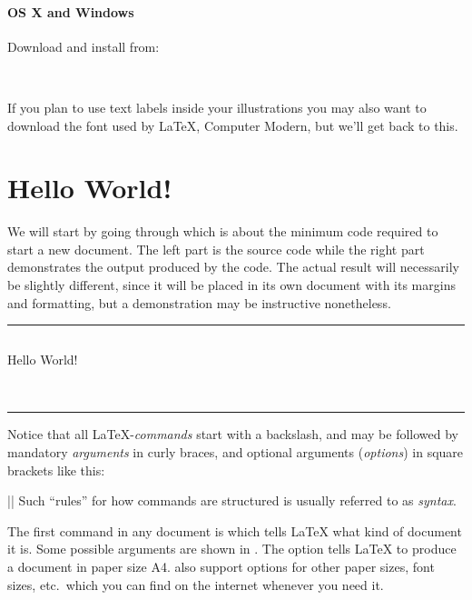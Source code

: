 \paragraph{OS X and Windows}
Download and install from:

~\\

If you plan to use text labels inside your illustrations you may also want to download the font used by \LaTeX{}, Computer Modern, but we'll get back to this.


\section{Hello World!}
We will start by going through  which is about the minimum code required to start a new document. The left part is the source code while the right part demonstrates the output produced by the code. The actual result will necessarily be slightly different, since it will be placed in its own document with its margins and formatting, but a demonstration may be instructive nonetheless.

\begin{listing}
	\rule{\textwidth}{0.4pt}
	\begin{minipage}[t]{0.49\textwidth}
		\inputminted[frame=none]{latex}{latex/first.tex}
	\end{minipage}\hfill\vline\hfill
	\begin{minipage}[t]{0.49\textwidth}
		Hello World!
	\end{minipage}\\[0.5em]
	\rule{\textwidth}{0.4pt}
	\caption{A (near-)minimal \LaTeX{} document}
	\label{lst:latex:minimal}
\end{listing}

Notice that all \LaTeX{}-\emph{commands} start with a backslash, and may be followed by mandatory \emph{arguments} in curly braces, and optional arguments (\emph{options}) in square brackets like this:

\latexone||
\noindent Such ``rules'' for how commands are structured is usually referred to as \emph{syntax}.

\index{\latexin{\documentclass}}
The first command in any document is \latexin{\documentclass} which tells \LaTeX{} what kind of document it is. Some possible arguments are shown in . The option  tells \LaTeX{} to produce a document in paper size A4. \latexin{\documentclass} also support options for other paper sizes, font sizes, etc.\ which you can find on the internet whenever you need it.

